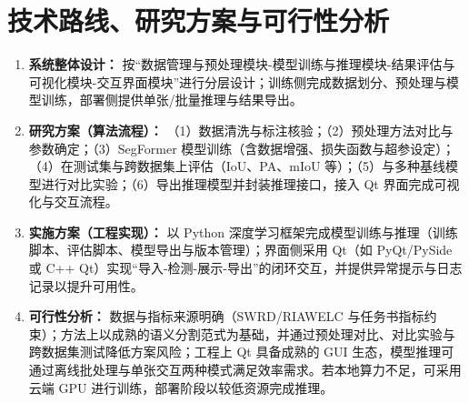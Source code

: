 \documentclass{cjlu_proposal}
\begin{document}
\section{技术路线、研究方案与可行性分析}
\begin{enumerate}[leftmargin=*]
  \item \textbf{系统整体设计：} 按“数据管理与预处理模块-模型训练与推理模块-结果评估与可视化模块-交互界面模块”进行分层设计；训练侧完成数据划分、预处理与模型训练，部署侧提供单张/批量推理与结果导出。
  \item \textbf{研究方案（算法流程）：} （1）数据清洗与标注核验；（2）预处理方法对比与参数确定；（3）SegFormer 模型训练（含数据增强、损失函数与超参设定）；（4）在测试集与跨数据集上评估（IoU、PA、mIoU 等）；（5）与多种基线模型进行对比实验；（6）导出推理模型并封装推理接口，接入 Qt 界面完成可视化与交互流程。
  \item \textbf{实施方案（工程实现）：} 以 Python 深度学习框架完成模型训练与推理（训练脚本、评估脚本、模型导出与版本管理）；界面侧采用 Qt（如 PyQt/PySide 或 C++ Qt）实现“导入-检测-展示-导出”的闭环交互，并提供异常提示与日志记录以提升可用性。
  \item \textbf{可行性分析：} 数据与指标来源明确（SWRD/RIAWELC 与任务书指标约束）；方法上以成熟的语义分割范式为基础，并通过预处理对比、对比实验与跨数据集测试降低方案风险；工程上 Qt 具备成熟的 GUI 生态，模型推理可通过离线批处理与单张交互两种模式满足效率需求。若本地算力不足，可采用云端 GPU 进行训练，部署阶段以较低资源完成推理。
\end{enumerate}
\end{document}
